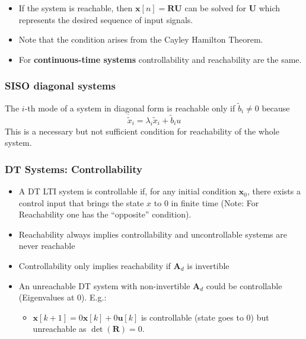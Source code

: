 \newpar{}
\begin{itemize}
    \item If the system is reachable, then $\mathbf{x}[n] = \mathbf{RU}$ can be solved for $\mathbf{U}$ which represents the desired sequence of input signals.
    \item Note that the condition arises from the Cayley Hamilton Theorem.
    \item For \textbf{continuous-time systems} controllability and reachability are the same.
\end{itemize}

\subsubsection{SISO diagonal systems}

The $i$-th mode of a system in diagonal form is reachable only if $\tilde{b}_i \neq 0$ because
\begin{equation*}
    \dot{\tilde{x}}_i =\lambda_i\tilde{x}_i+\tilde{b}_i u
\end{equation*}
This is a necessary but not sufficient condition for reachability of the whole system.

\subsubsection{DT Systems: Controllability}

\begin{itemize}
    \item A DT LTI system is controllable if, for any initial condition $\mathbf{x}_0$, there exists a control input that brings the state $x$ to $0$ in finite time (Note: For Reachability one has the ``opposite'' condition).
    \item Reachability always implies controllability and uncontrollable systems are never reachable
    \item Controllability only implies reachability if $\mathbf{A}_d$ is invertible %
    \item An unreachable DT system with non-invertible $\mathbf{A}_d$ could be controllable (Eigenvalues at 0). E.g.:
          \begin{itemize}
              \item $\mathbf{x}[k+1] = 0\mathbf{x}[k] + 0\mathbf{u}[k]$ is controllable (state goes to $0$) but unreachable as $\det(\mathbf{R})=0$.
          \end{itemize}
\end{itemize}

